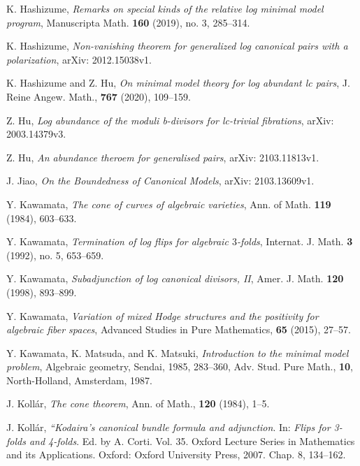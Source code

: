 \documentclass[11pt]{amsart}
\numberwithin{equation}{section}
\theoremstyle{definition}
\theoremstyle{definition}
\theoremstyle{definition}
\begin{document}
\begin{thebibliography}{99}
 K. Hashizume, \textit{Remarks on special kinds of the relative log minimal model program}, Manuscripta Math. \textbf{160} (2019), no. 3, 285--314.


 K. Hashizume, \textit{Non-vanishing theorem for generalized log canonical pairs with a polarization}, arXiv: 2012.15038v1.

  K. Hashizume and Z. Hu, \textit{On minimal model theory for log abundant lc pairs}, J. Reine Angew. Math., \textbf{767} (2020), 109--159. 

 Z. Hu, \textit{Log abundance of the moduli b-divisors for lc-trivial fibrations}, arXiv: 2003.14379v3.

 Z. Hu, \textit{An abundance theroem for generalised pairs}, arXiv: 2103.11813v1.

 J. Jiao, \textit{On the Boundedness of Canonical Models}, arXiv: 2103.13609v1.

 Y. Kawamata, \textit{The cone of curves of algebraic varieties}, Ann. of Math. \textbf{119} (1984), 603--633.

 Y. Kawamata, \textit{Termination  of  log  flips  for  algebraic $3$-folds}, Internat. J. Math. \textbf{3} (1992), no. 5, 653--659.

 Y. Kawamata, \textit{Subadjunction of log canonical divisors, II}, Amer. J. Math. \textbf{120} (1998), 893--899.

 Y. Kawamata, \textit{Variation of mixed Hodge structures and the positivity for algebraic fiber spaces}, Advanced Studies in Pure Mathematics, \textbf{65} (2015), 27--57.

 Y. Kawamata, K. Matsuda, and K. Matsuki, \textit{Introduction to the minimal model problem}, Algebraic geometry, Sendai, 1985, 283--360, Adv. Stud. Pure Math., \textbf{10}, North-Holland, Amsterdam, 1987.

 J. Koll\'ar, \textit{The cone theorem}, Ann. of Math., \textbf{120} (1984), 1--5.

 J. Koll\'ar, \textit{“Kodaira’s canonical bundle formula and adjunction}. In: \textit{Flips for 3-folds and 4-folds}. Ed. by A. Corti. Vol. 35. Oxford Lecture Series in Mathematics and its Applications. Oxford: Oxford University Press, 2007. Chap. 8, 134--162.


\end{thebibliography}
\end{document}

